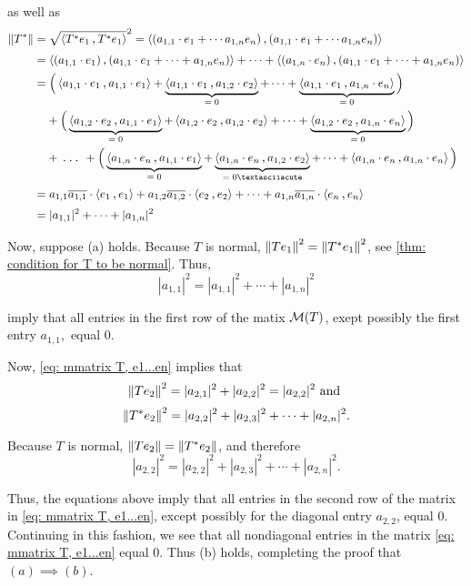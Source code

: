 \begin{prf}
  as well as
  \[
  \begin{aligned}
     \norm{T^*} &= \sqrt{\ip{T^*e_1}{T^*e_1}}^2
    = \ip{(a_{1,1}\cdot e_1 + \cdots a_{1,n} e_n)}{(a_{1,1}\cdot e_1 + \cdots a_{1,n} e_n)} \\
    & = \ip{(a_{1,1}\cdot e_1)}{(a_{1,1}\cdot e_1 + \cdots + a_{1,n} e_n)} + \cdots + \ip{(a_{1,n}\cdot e_n)}{(a_{1,1}\cdot e_1 + \cdots +a_{1,n} e_n)} \\
    & = \Big( \ip{a_{1,1} \cdot e_1}{a_{1,1}\cdot e_1} + \underbrace{\ip{a_{1,1} \cdot e_1}{a_{1,2}\cdot e_2}}_{= \; 0} + \cdots + \underbrace{\ip{a_{1,1} \cdot e_1}{a_{1,n}\cdot e_n}}_{= \; 0} \Big) \\
    & \phantom { = } \; +
    \Big( \underbrace{\ip{a_{1,2} \cdot e_2}{a_{1,1}\cdot e_1}}_{= \; 0} + \ip{a_{1,2} \cdot e_2}{a_{1,2}\cdot e_2} + \cdots + \underbrace{\ip{a_{1,2} \cdot e_2}{a_{1,n}\cdot e_n}}_{= \; 0} \Big) \\
    & \phantom { = } \; + \mathlarger{\ddd} +
    \Big( \underbrace{\ip{a_{1,n} \cdot e_n}{a_{1,1}\cdot e_1}}_{= \; 0} + \underbrace{\ip{a_{1,n} \cdot e_n}{a_{1,2}\cdot e_2}}_{= \; 0´} + \cdots + \ip{a_{1,n} \cdot e_n}{a_{1,n}\cdot e_n} \Big) \\
    & = a_{1,1} \overline{a_{1,1}} \cdot  \ip{e_1}{e_1} + a_{1,2} \overline{a_{1,2}} \cdot  \ip{e_2}{e_2} + \cdots + a_{1,n} \overline{a_{1,n}} \cdot  \ip{e_n}{e_n} \\
    & = |a_{1,1}|^2 + \cdots + |a_{1,n}|^2
  \end{aligned}
  \]

  \StepOne Now, suppose (a) holds. Because $T$ is normal, $\left \lVert T e_1 \right \rVert^2 = \left \lVert T^* e_1 \right \rVert^2$, see \ref{thm: condition for T to be normal}. Thus,
  \[
  |a_{1,1}|^2 = |a_{1,1}|^2 + \cdots + |a_{1,n}|^2
  \]

  imply that all entries in the first row of the matix $\mathcal{M}(T)$, exept possibly the first entry $a_{1,1},$ equal $0$.

  Now, \eqref{eq: mmatrix T, e1...en} implies that
  \[
  \norm{Te_2}^2 = |a_{2,1}|^2 + |a_{2,2}|^2 = |a_{2,2}|^2 $ and $
  \]
  \[
  \left \lVert T^* e_2 \right \rVert^2 = |a_{2,2}|^2 + |a_{2,3}|^2 + \cdots + |a_{2,n}|^2.
  \]

  Because $T$ is normal, $\left \lVert T e_2 \right \rVert = \left \lVert T^* e_2 \right \rVert$, and therefore
  \begin{equation}
    |a_{2,2}|^2=|a_{2,2}|^2 + |a_{2,3}|^2 + \cdots + |a_{2,n}|^2.
  \end{equation}

  Thus, the equations above imply that all entries in the second row of the matrix in \eqref{eq: mmatrix T, e1...en}, except possibly for the diagonal entry $a_{2,2}$, equal $0$. Continuing in this fashion, we see that all nondiagonal entries in the matrix \eqref{eq: mmatrix T, e1...en} equal $0$. Thus (b) holds, completing the proof that $(a) \implies (b)$.


\end{prf}
